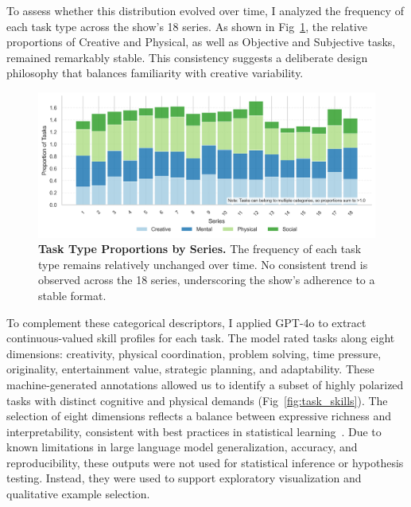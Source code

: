 \documentclass[10pt,letterpaper]{article}
\begin{document}
To assess whether this distribution evolved over time, I analyzed the frequency of each task type across the show's 18 series. As shown in Fig~\ref{fig:task_type_stability}, the relative proportions of Creative and Physical, as well as Objective and Subjective tasks, remained remarkably stable. This consistency suggests a deliberate design philosophy that balances familiarity with creative variability.

\begin{figure}[!h]
\centering
\includegraphics[width=\linewidth]{figures/main/Fig2.png}
\caption{{\bf Task Type Proportions by Series.}
The frequency of each task type remains relatively unchanged over time. No consistent trend is observed across the 18 series, underscoring the show's adherence to a stable format.}
\label{fig:task_type_stability}
\end{figure}
\FloatBarrier



To complement these categorical descriptors, I applied GPT-4o to extract continuous-valued skill profiles for each task. The model rated tasks along eight dimensions: creativity, physical coordination, problem solving, time pressure, originality, entertainment value, strategic planning, and adaptability. These machine-generated annotations allowed us to identify a subset of highly polarized tasks with distinct cognitive and physical demands (Fig~\ref{fig:task_skills}). The selection of eight dimensions reflects a balance between expressive richness and interpretability, consistent with best practices in statistical learning~\cite{Hastie2009,James2013}. Due to known limitations in large language model generalization, accuracy, and reproducibility, these outputs were not used for statistical inference or hypothesis testing. Instead, they were used to support exploratory visualization and qualitative example selection.
\end{document}
